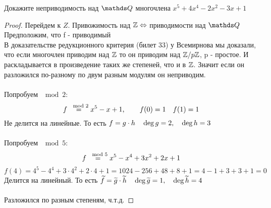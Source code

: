 \documentclass[12pt, fleqn]{article}
\begin{document}
\begin{example}
  Докажите неприводимость над $\Q$ многочлена $x^5 + 4x^4 - 2x^2 - 3x + 1$
\end{example}

\begin{proof}
  Перейдем к $Z$. Привожимость над $\mathbb{Z} \Leftrightarrow$ приводимости над $\Q$\\
  Предположим, что f - приводимый\\
  В доказательстве редукционного критерия (билет 33) у Всемирнова мы доказали, что если многочлен приводим над $\mathbb{Z}$ то он приводим над $\mathbb{Z}/p\mathbb{Z}$, p - простое. И раскладывается в произведение таких же степеней, что и в $\mathbb{Z}$. Значит если он разложился по-разному по двум разным модулям он неприводим.\\ \\
  Попробуем $\mod 2$:
  \[f \overset{\mod 2}{=} x^5 - x + 1, \qquad f(0) = 1\quad f(1) = 1\]
  Не делится на линейные. То есть $f = g \cdot h \quad \deg g = 2,\quad \deg h = 3$ \\ \\
  Попробуем $\mod 5$:
  \[f \overset{\mod 5}{=} x^5 - x^4 + 3x^2 + 2x + 1\]%
  \[f(4) = 4^5 - 4^4 + 3 \cdot 4^2 + 2 \cdot 4 + 1 = 1024 - 256 + 48 + 8 + 1 = 4 - 1 + 3 + 3 + 1 = 0\]
  Делится на линейный. То есть $\widetilde{f} = \widetilde{g} \cdot \widetilde{h} \quad \deg \widetilde{g} = 1,\quad \deg \widetilde{h} = 4$ \\ \\
  Разложился по разным степеням, ч.т.д.

\end{proof}
\end{document}
